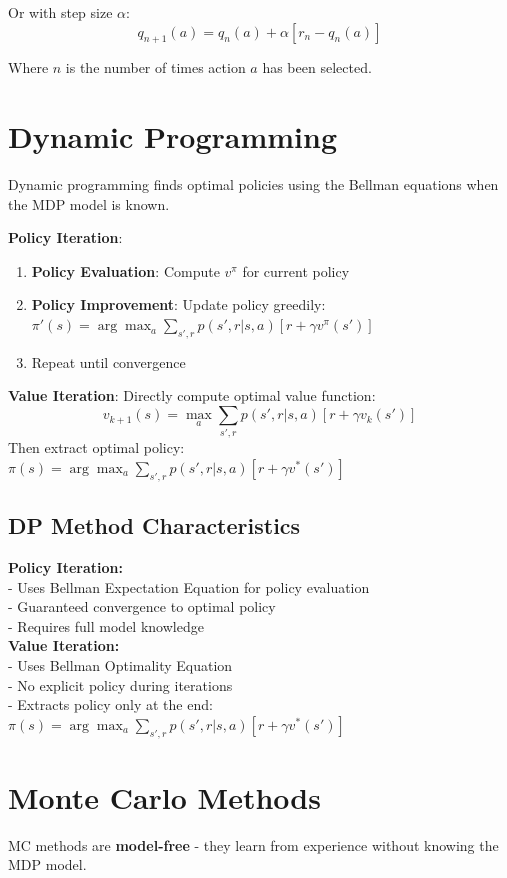 \documentclass[a4paper,11pt]{article}
\newcommand{\cf}[1]{\[#1\]}
\newcommand{\f}[1]{${#1}$}
\renewcommand{\b}[1]{\textbf{#1}}
\begin{document}
Or with step size $\alpha$:
$$q_{n+1}(a) = q_n(a) + \alpha[r_n - q_n(a)]$$

Where $n$ is the number of times action $a$ has been selected.

\section{Dynamic Programming}

Dynamic programming finds optimal policies using the Bellman equations when the MDP model is known.

\b{Policy Iteration}:
\begin{enumerate}
    \item \textbf{Policy Evaluation}: Compute \f{v^\pi} for current policy
    \item \textbf{Policy Improvement}: Update policy greedily: \f{\pi'(s) = \arg\max_a \sum_{s',r} p(s',r|s,a)[r + \gamma v^\pi(s')]}
    \item Repeat until convergence
\end{enumerate}

\b{Value Iteration}: Directly compute optimal value function:
\cf{v_{k+1}(s) = \max_a \sum_{s',r} p(s',r|s,a)[r + \gamma v_k(s')]}
Then extract optimal policy: \f{\pi(s) = \arg\max_a \sum_{s',r} p(s',r|s,a)[r + \gamma v^*(s')]}

\subsection{DP Method Characteristics}
\textbf{Policy Iteration:}\\
- Uses Bellman Expectation Equation for policy evaluation\\
- Guaranteed convergence to optimal policy\\
- Requires full model knowledge\\

\textbf{Value Iteration:}\\
- Uses Bellman Optimality Equation\\
- No explicit policy during iterations\\
- Extracts policy only at the end: $\pi(s) = \arg\max_a \sum_{s',r} p(s',r|s,a)[r + \gamma v^*(s')]$

\section{Monte Carlo Methods}

MC methods are \textbf{model-free} - they learn from experience without knowing the MDP model.
\end{document}
